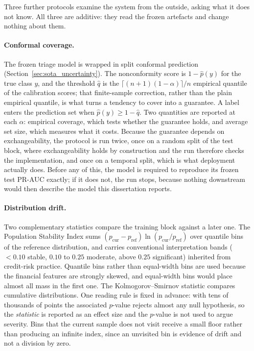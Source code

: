 Three further protocols examine the system from the outside, asking what it does not know. All three
are additive: they read the frozen artefacts and change nothing about them.

\paragraph{Conformal coverage.} The frozen triage model is wrapped in split conformal prediction
(Section~\ref{sec:sota_uncertainty}). The nonconformity score is $1 - \hat{p}(y)$ for the true class
$y$, and the threshold $\hat{q}$ is the $\lceil (n+1)(1-\alpha)\rceil / n$ empirical quantile of the
calibration scores; that finite-sample correction, rather than the plain empirical quantile, is what
turns a tendency to cover into a guarantee. A label enters the prediction set when
$\hat{p}(y) \ge 1 - \hat{q}$. Two quantities are reported at each $\alpha$: empirical coverage,
which tests whether the guarantee holds, and average set size, which measures what it costs. Because
the guarantee depends on exchangeability, the protocol is run twice, once on a random split of the
test block, where exchangeability holds by construction and the run therefore checks the
implementation, and once on a temporal split, which is what deployment actually does. Before any of
this, the model is required to reproduce its frozen test PR-AUC exactly; if it does not, the run
stops, because nothing downstream would then describe the model this dissertation reports.

\paragraph{Distribution drift.} Two complementary statistics compare the training block against a
later one. The Population Stability Index sums $(p_{\text{cur}} - p_{\text{ref}})
\ln(p_{\text{cur}} / p_{\text{ref}})$ over quantile bins of the reference distribution, and carries
conventional interpretation bands ($<0.10$ stable, $0.10$ to $0.25$ moderate, above $0.25$
significant) inherited from credit-risk practice. Quantile bins rather than equal-width bins are used
because the financial features are strongly skewed, and equal-width bins would place almost all mass
in the first one. The Kolmogorov--Smirnov statistic compares cumulative distributions. One reading
rule is fixed in advance: with tens of thousands of points the associated $p$-value rejects almost
any null hypothesis, so the \emph{statistic} is reported as an effect size and the $p$-value is not
used to argue severity. Bins that the current sample does not visit receive a small floor rather than
producing an infinite index, since an unvisited bin is evidence of drift and not a division by zero.

